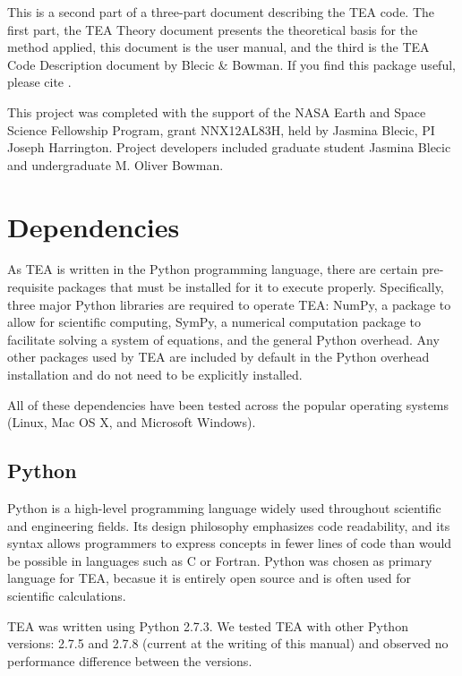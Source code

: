 This is a second part of a three-part document describing the TEA
code. The first part, the TEA Theory document
\citep{BlecicEtal2015-TEAtheory} presents the theoretical basis for
the method applied, this document is the user manual, and the third is
the TEA Code Description document by Blecic \& Bowman. If you find
this package useful, please cite \citet{BlecicEtal2015-TEAtheory}.


  This project was completed with the support of the NASA Earth and
  Space Science Fellowship Program, grant NNX12AL83H, held by Jasmina
  Blecic, PI Joseph Harrington. Project developers included graduate
  student Jasmina Blecic and undergraduate M. Oliver Bowman.


\section{Dependencies} 
\label{depen}
  As TEA is written in the Python programming language, there are
  certain pre-requisite packages that must be installed for it to
  execute properly.  Specifically, three major Python libraries are
  required to operate TEA: NumPy, a package to allow for scientific
  computing, SymPy, a numerical computation package to facilitate
  solving a system of equations, and the general Python overhead.  Any
  other packages used by TEA are included by default in the Python
  overhead installation and do not need to be explicitly installed.
  
  All of these dependencies have been tested across the popular
  operating systems (Linux, Mac OS X, and Microsoft Windows).
  
\subsection{Python}
\label{python}
  Python is a high-level programming language widely used throughout
  scientific and engineering fields.  Its design philosophy emphasizes
  code readability, and its syntax allows programmers to express
  concepts in fewer lines of code than would be possible in languages
  such as C or Fortran.  Python was chosen as primary language for
  TEA, becasue it is entirely open source and is often used for
  scientific calculations.


  TEA was written using Python 2.7.3. We tested TEA with other Python
  versions: 2.7.5 and 2.7.8 (current at the writing of this manual)
  and observed no performance difference between the versions.


